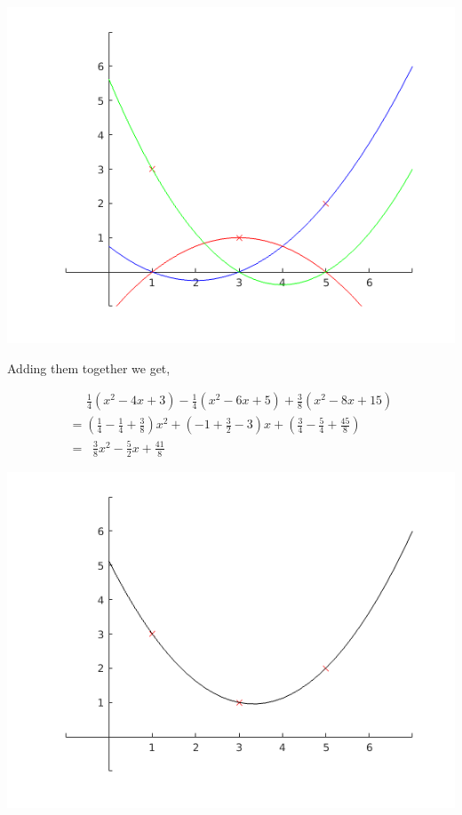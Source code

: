 \documentclass[MathsNotesBase.tex]{subfiles}
\begin{document}
{	
	\begin{center}
	\includegraphics[width=\linewidth]{figure_3.png}
	\end{center}
	
	
	\begin{par}
	\begin{flushleft}
	Adding them together we get,
	\end{flushleft}
	\end{par}
	
	\begin{par}
	$$\begin{array}{lcr}
	\;\;\;\;\; \frac{1}{4}(x^2-4x+3) - \frac{1}{4}(x^2-6x+5) + \frac{3}{8}(x^2-8x+15) \\[8pt]
	= (\frac{1}{4}  - \frac{1}{4} + \frac{3}{8})x^2 + (-1 + \frac{3}{2} - 3)x + (\frac{3}{4} - \frac{5}{4} + \frac{45}{8}) \\[8pt]
	= \;\; \frac{3}{8}x^2 - \frac{5}{2}x + \frac{41}{8} 
	\end{array}$$
	\end{par}
	
	
	\begin{center}
	\includegraphics[width=\linewidth]{figure_4.png}
	\end{center}

}
\end{document}
